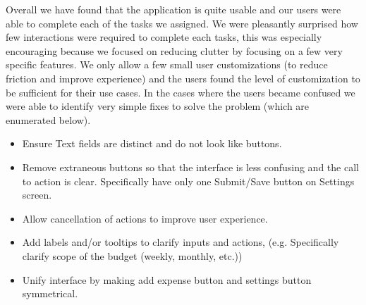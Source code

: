 \documentclass{chi2011}
\begin{document}
Overall we have found that the application is quite usable and our users were able to complete each of the tasks we
assigned. We were pleasantly surprised how few interactions were required to complete each tasks, this was especially
encouraging because we focused on reducing clutter by focusing on a few very specific features. We only allow a few
small user customizations (to reduce friction and improve experience) and the users found the level of
customization to be sufficient for their use cases. In the cases where the users became confused we were able to
identify very simple fixes to solve the problem (which are enumerated below).

    \begin{itemize}
        \item Ensure Text fields are distinct and do not look like buttons.
        \item Remove extraneous buttons so that the interface is less confusing and the call to action is clear.
            Specifically have only one Submit/Save button on Settings screen.
        \item Allow cancellation of actions to improve user experience.
        \item Add labels and/or tooltips to clarify inputs and actions, (e.g. Specifically clarify scope of the budget
            (weekly, monthly, etc.))
        \item Unify interface by making add expense button and settings button symmetrical.
    \end{itemize}
\end{document}
